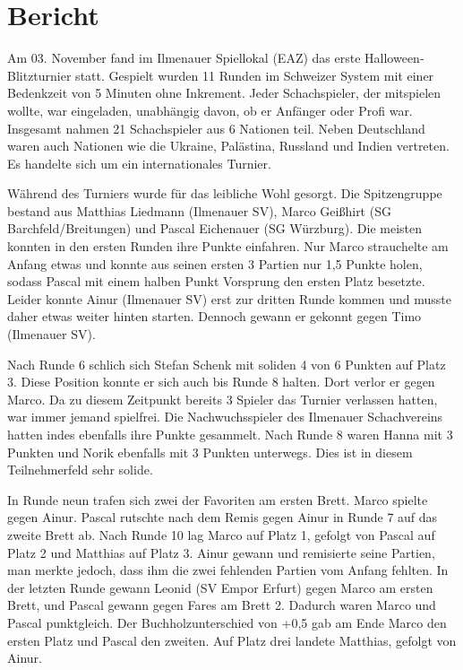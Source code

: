 \documentclass[a4paper,ngerman]{tui-algo-seminar}
\title{\content}
\author{Erik Skopp}
\begin{document}
	
	\maketitle
\thispagestyle{plain} %

\begin{abstract}


. 
\end{abstract}

\section{Bericht}
Am 03. November fand im Ilmenauer Spiellokal (EAZ) das erste Halloween-Blitzturnier statt. Gespielt wurden 11 Runden im Schweizer System mit einer Bedenkzeit von 5 Minuten ohne Inkrement. Jeder Schachspieler, der mitspielen wollte, war eingeladen, unabhängig davon, ob er Anfänger oder Profi war. Insgesamt nahmen 21 Schachspieler aus 6 Nationen teil. Neben Deutschland waren auch Nationen wie die Ukraine, Palästina, Russland und Indien vertreten. Es handelte sich um ein internationales Turnier.

Während des Turniers wurde für das leibliche Wohl gesorgt. Die Spitzengruppe bestand aus Matthias Liedmann (Ilmenauer SV), Marco Geißhirt (SG Barchfeld/Breitungen) und Pascal Eichenauer (SG Würzburg). Die meisten konnten in den ersten Runden ihre Punkte einfahren. Nur Marco strauchelte am Anfang etwas und konnte aus seinen ersten 3 Partien nur 1,5 Punkte holen, sodass Pascal mit einem halben Punkt Vorsprung den ersten Platz besetzte. Leider konnte Ainur (Ilmenauer SV) erst zur dritten Runde kommen und musste daher etwas weiter hinten starten. Dennoch gewann er gekonnt gegen Timo (Ilmenauer SV).

Nach Runde 6 schlich sich Stefan Schenk mit soliden 4 von 6 Punkten auf Platz 3. Diese Position konnte er sich auch bis Runde 8 halten. Dort verlor er gegen Marco. Da zu diesem Zeitpunkt bereits 3 Spieler das Turnier verlassen hatten, war immer jemand spielfrei. Die Nachwuchsspieler des Ilmenauer Schachvereins hatten indes ebenfalls ihre Punkte gesammelt. Nach Runde 8 waren Hanna mit 3 Punkten und Norik ebenfalls mit 3 Punkten unterwegs. Dies ist in diesem Teilnehmerfeld sehr solide.

In Runde neun trafen sich zwei der Favoriten am ersten Brett. Marco spielte gegen Ainur. Pascal rutschte nach dem Remis gegen Ainur in Runde 7 auf das zweite Brett ab. Nach Runde 10 lag Marco auf Platz 1, gefolgt von Pascal auf Platz 2 und Matthias auf Platz 3. Ainur gewann und remisierte seine Partien, man merkte jedoch, dass ihm die zwei fehlenden Partien vom Anfang fehlten. In der letzten Runde gewann Leonid (SV Empor Erfurt) gegen Marco am ersten Brett, und Pascal gewann gegen Fares am Brett 2. Dadurch waren Marco und Pascal punktgleich. Der Buchholzunterschied von +0,5 gab am Ende Marco den ersten Platz und Pascal den zweiten. Auf Platz drei landete Matthias, gefolgt von Ainur.
\end{document}
